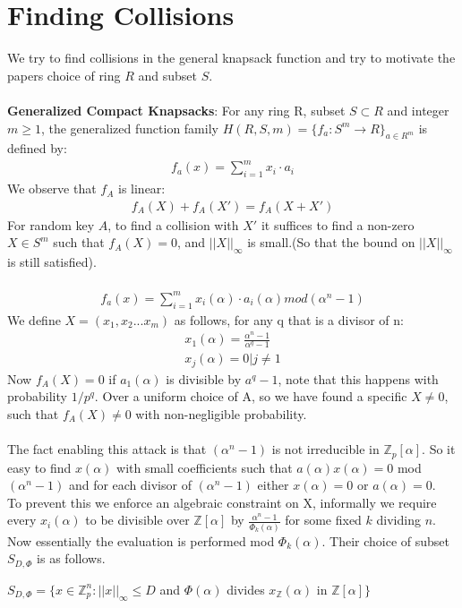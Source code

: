 \section{Finding Collisions}
We try to find collisions in the general knapsack function and try to motivate the papers choice of ring $R$ and subset $S$.
\\~\\
\textbf{Generalized Compact Knapsacks}: For any ring R, subset $S \subset R$ and integer $m \geq 1$, the generalized function family $H(R,S,m) = \{f_a : S^m \rightarrow R\}_{a\in R^m}$ is defined by:
\begin{align*}
f_a(x) = \sum_{i=1}^{m}x_i \cdot a_i
\end{align*}
We observe that $f_A$ is linear:
\begin{align*}
f_A(X) + f_A(X') = f_A (X + X')
\end{align*}
For random key $A$, to find a collision with $X'$ it suffices to find a non-zero $X \in S^m$ such that $f_A(X) = 0$, and $||X||_\infty$ is small.(So that the bound on $||X||_\infty$ is still satisfied).
\\~\\
\begin{align*}
f_a(x) = \sum_{i=1}^{m}x_i(\alpha) \cdot a_i(\alpha) mod (\alpha^n - 1)
\end{align*}
We define $X = (x_1,x_2...x_m)$ as follows, for any q that is a divisor of n:
\begin{align*}
x_1(\alpha) = \frac{\alpha^n-1}{\alpha^q-1}
\\
x_j(\alpha) = 0 | j \neq 1
\end{align*}
Now $f_A(X) = 0$ if $a_1(\alpha)$ is divisible by $a^q - 1$, note that this happens with probability $1/p^q$. Over a uniform choice of A, so we have found a specific $X \neq 0$, such that $f_A(X) \neq 0$ with non-negligible probability.
\\~\\
The fact enabling this attack is that $(\alpha^n-1)$ is not irreducible in $\mathbb{Z}_p[\alpha]$. So it easy to find $x(\alpha)$ with small coefficients such that $a(\alpha)x(\alpha) = 0$ mod $(\alpha^n-1)$ and for each divisor of $(\alpha^n-1)$ either $x(\alpha) = 0$ or $a(\alpha) = 0$.
\\
To prevent this we enforce an algebraic constraint on X, informally we require every $x_i(\alpha)$ to be divisible over $\mathbb{Z}[\alpha]$ by $\frac{\alpha^n-1}{\Phi_k(\alpha)}$ for some fixed $k$ dividing $n$. Now essentially the evaluation is performed mod $\Phi_k(\alpha)$. Their choice of subset $S_{D,\Phi}$ is as follows.
\begin{center}
	$S_{D,\Phi} = \{x \in \mathbb{Z}^n_p : ||x||_\infty \leq D$ and $\Phi(\alpha)$ divides $x_\mathbb{Z}(\alpha)$ in $\mathbb{Z}[\alpha]\}$
\end{center}